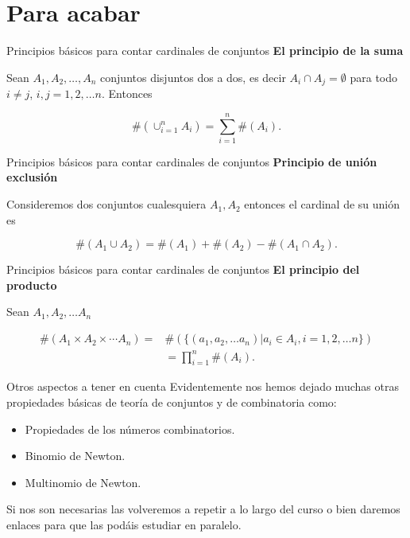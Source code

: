 \documentclass[
  ignorenonframetext,
  aspectratio=169]{beamer}
\providecommand{\tightlist}{%
  \setlength{\itemsep}{0pt}\setlength{\parskip}{0pt}}\usepackage{longtable,booktabs,array}
\begin{document}
\hypertarget{para-acabar}{%
\section{Para acabar}\label{para-acabar}}

\begin{frame}{Principios básicos para contar cardinales de conjuntos}
\protect\hypertarget{principios-buxe1sicos-para-contar-cardinales-de-conjuntos}{}
\textbf{El principio de la suma}

Sean \(A_1, A_2,\ldots, A_n\) conjuntos disjuntos dos a dos, es decir
\(A_i\cap A_j=\emptyset\) para todo \(i\not= j\), \(i,j=1,2,\ldots n\).
Entonces

\[\#(\cup_{i=1}^n A_i)=\sum_{i=1}^n \#(A_i).\]
\end{frame}

\begin{frame}{Principios básicos para contar cardinales de conjuntos}
\protect\hypertarget{principios-buxe1sicos-para-contar-cardinales-de-conjuntos-1}{}
\textbf{Principio de unión exclusión}

Consideremos dos conjuntos cualesquiera \(A_1, A_2\) entonces el
cardinal de su unión es

\[\#(A_1\cup A_2)=\#(A_1)+\#(A_2)-\#(A_1\cap A_2).\]
\end{frame}

\begin{frame}{Principios básicos para contar cardinales de conjuntos}
\protect\hypertarget{principios-buxe1sicos-para-contar-cardinales-de-conjuntos-2}{}
\textbf{El principio del producto}

Sean \(A_1,A_2,\ldots A_n\)

\[
\begin{array}{ll}
\#(A_1\times A_2\times \cdots A_n)=&\#\left(\{(a_1,a_2,\ldots a_n)| a_i\in A_i, i=1,2,\ldots n\}\right)\\
&=\prod_{i=1}^n \#(A_i).
\end{array}
\]
\end{frame}

\begin{frame}{Otros aspectos a tener en cuenta}
\protect\hypertarget{otros-aspectos-a-tener-en-cuenta}{}
Evidentemente nos hemos dejado muchas otras propiedades básicas de
teoría de conjuntos y de combinatoria como:

\begin{itemize}
\tightlist
\item
  Propiedades de los números combinatorios.
\item
  Binomio de Newton.
\item
  Multinomio de Newton.
\end{itemize}

Si nos son necesarias las volveremos a repetir a lo largo del curso o
bien daremos enlaces para que las podáis estudiar en paralelo.
\end{frame}
\end{document}
